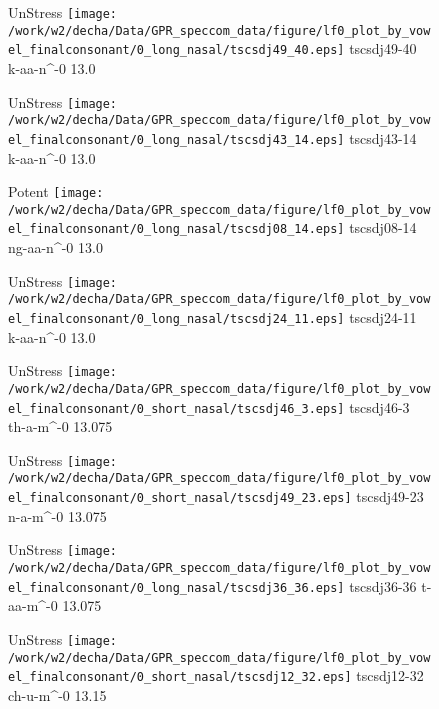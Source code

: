\documentclass{article}
\begin{document}
\begin{figure}[t]
\begin{minipage}[b]{.24\textwidth}
UnStress
\centering
\texttt{[image: /work/w2/decha/Data/GPR\_speccom\_data/figure/lf0\_plot\_by\_vowel\_finalconsonant/0\_long\_nasal/tscsdj49\_40.eps]}
tscsdj49-40 k-aa-n\textasciicircum-0 13.0
\end{minipage}
\begin{minipage}[b]{.24\textwidth}
UnStress
\centering
\texttt{[image: /work/w2/decha/Data/GPR\_speccom\_data/figure/lf0\_plot\_by\_vowel\_finalconsonant/0\_long\_nasal/tscsdj43\_14.eps]}
tscsdj43-14 k-aa-n\textasciicircum-0 13.0
\end{minipage}
\begin{minipage}[b]{.24\textwidth}
\colorbox{Apricot}{Potent}
\centering
\texttt{[image: /work/w2/decha/Data/GPR\_speccom\_data/figure/lf0\_plot\_by\_vowel\_finalconsonant/0\_long\_nasal/tscsdj08\_14.eps]}
tscsdj08-14 ng-aa-n\textasciicircum-0 13.0
\end{minipage}
\begin{minipage}[b]{.24\textwidth}
UnStress
\centering
\texttt{[image: /work/w2/decha/Data/GPR\_speccom\_data/figure/lf0\_plot\_by\_vowel\_finalconsonant/0\_long\_nasal/tscsdj24\_11.eps]}
tscsdj24-11 k-aa-n\textasciicircum-0 13.0
\end{minipage}
\end{figure}

\begin{figure}[t]
\begin{minipage}[b]{.24\textwidth}
UnStress
\centering
\texttt{[image: /work/w2/decha/Data/GPR\_speccom\_data/figure/lf0\_plot\_by\_vowel\_finalconsonant/0\_short\_nasal/tscsdj46\_3.eps]}
tscsdj46-3 th-a-m\textasciicircum-0 13.075
\end{minipage}
\begin{minipage}[b]{.24\textwidth}
UnStress
\centering
\texttt{[image: /work/w2/decha/Data/GPR\_speccom\_data/figure/lf0\_plot\_by\_vowel\_finalconsonant/0\_short\_nasal/tscsdj49\_23.eps]}
tscsdj49-23 n-a-m\textasciicircum-0 13.075
\end{minipage}
\begin{minipage}[b]{.24\textwidth}
UnStress
\centering
\texttt{[image: /work/w2/decha/Data/GPR\_speccom\_data/figure/lf0\_plot\_by\_vowel\_finalconsonant/0\_long\_nasal/tscsdj36\_36.eps]}
tscsdj36-36 t-aa-m\textasciicircum-0 13.075
\end{minipage}
\begin{minipage}[b]{.24\textwidth}
UnStress
\centering
\texttt{[image: /work/w2/decha/Data/GPR\_speccom\_data/figure/lf0\_plot\_by\_vowel\_finalconsonant/0\_short\_nasal/tscsdj12\_32.eps]}
tscsdj12-32 ch-u-m\textasciicircum-0 13.15
\end{minipage}
\end{figure}
\end{document}
